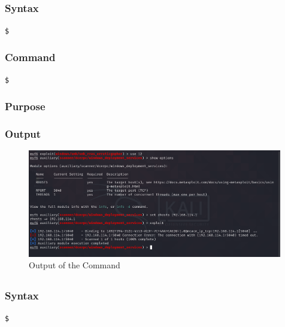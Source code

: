 \documentclass[11pt]{article}
\begin{document}
\subsection{}

\subsubsection*{Syntax}
\begin{verbatim}
$
\end{verbatim}

\subsubsection*{Command}
\begin{verbatim}
$
\end{verbatim}

\subsubsection*{Purpose}

\subsubsection*{Output}
\begin{figure}[H]
    \centering
    \includegraphics[width=0.99\textwidth]{a3_ss (23).png}
    \caption{Output of the Command}
\end{figure}
\subsection{}

\subsubsection*{Syntax}
\begin{verbatim}
$
\end{verbatim}
\end{document}
